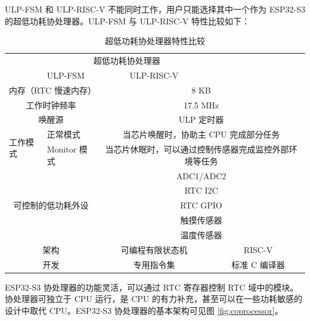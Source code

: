 \documentclass[main\_\_CN.tex]{subfiles}
\begin{document}
ULP-FSM 和 ULP-RISC-V 不能同时工作，用户只能选择其中一个作为 ESP32-S3 的超低功耗协处理器。ULP-FSM 与 ULP-RISC-V 特性比较如下：

\clearpage

\begin{table}[H]\label{tab:ulp-fsm-vs-ulp-risc-v}
    \caption{超低功耗协处理器特性比较}
    \centering
    \begin{tabular}[c]{| p{2.5cm} | p{3cm} | c | c |}
    \hline
    \rowcolor{lightgray}
    \multicolumn{2}{|c}{} & \multicolumn{2}{|c|}{超低功耗协处理器}         \\
    \cline{3-4}
    \rowcolor{lightgray}
    \multicolumn{2}{|c|}{\multirow{-2}{*}{特性}} & ULP-FSM & ULP-RISC-V  \\
    \hline
    \multicolumn{2}{|c}{内存（RTC 慢速内存）}  & \multicolumn{2}{|c|}{8 KB}  \\
    \hline
    \multicolumn{2}{|c}{工作时钟频率} & \multicolumn{2}{|c|}{17.5 MHz} \\
    \hline
    \multicolumn{2}{|c}{唤醒源} & \multicolumn{2}{|c|}{ULP 定时器} \\
    \hline
    \multirow{2}{*}{工作模式} & 正常模式 & \multicolumn{2}{c|}{当芯片唤醒时，协助主 CPU 完成部分任务} \\
    \cline{2-4}
    & Monitor 模式 & \multicolumn{2}{c|}{当芯片休眠时，可以通过控制传感器完成监控外部环境等任务} \\
    \hline
    \multicolumn{2}{|c}{\multirow{5}{*}{可控制的低功耗外设}} & \multicolumn{2}{|c|}{ADC1/ADC2}    \\
    \cline{3-4}
    \multicolumn{2}{|c}{} & \multicolumn{2}{|c|}{RTC I2C}  \\
    \cline{3-4}
    \multicolumn{2}{|c}{} & \multicolumn{2}{|c|}{RTC GPIO}  \\
     \cline{3-4}
    \multicolumn{2}{|c}{} & \multicolumn{2}{|c|}{触摸传感器}  \\
     \cline{3-4}
    \multicolumn{2}{|c}{} & \multicolumn{2}{|c|}{温度传感器}   \\
    \hline
    \multicolumn{2}{|c|}{架构} & 可编程有限状态机 & RISC-V\\
    \hline
    \multicolumn{2}{|c|}{开发} & 专用指令集 & 标准 C 编译器 \\
    \hline
    \end{tabular}
\end{table}

ESP32-S3 协处理器的功能灵活，可以通过 RTC 寄存器控制 RTC 域中的模块。协处理器可独立于 CPU 运行，是 CPU 的有力补充，甚至可以在一些功耗敏感的设计中取代 CPU。ESP32-S3 协处理器的基本架构可见图 \ref{fig:coprocessor}。
\end{document}
